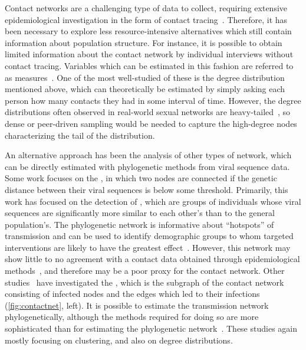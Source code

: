 Contact networks are a challenging type of data to collect, requiring extensive
epidemiological investigation in the form of contact
tracing~\autocite{morris1993epidemiology, welch2011statistical,
keeling2005networks, eames2015six}. Therefore, it has been necessary to explore
less resource-intensive alternatives which still contain information about
population structure. For instance, it is possible to obtain limited
information about the contact network by individual interviews without contact
tracing. Variables which can be estimated in this fashion are referred to as
 measures~\autocite{wasserman1994social}. One of the most
well-studied of these is the degree distribution mentioned above, which can 
theoretically be estimated by simply asking each person how many contacts they
had in some interval of time. However, the degree distributions often observed
in real-world sexual networks are heavy-tailed~\autocite{liljeros2001web,
schneeberger2004scale, colgate1989risk}, so dense or peer-driven sampling would
be needed to capture the high-degree nodes characterizing the tail of the
distribution.

An alternative approach has been the analysis of other types of network, which
can be directly estimated with phylogenetic methods from viral sequence data.
Some work focuses on the , in which two nodes are
connected if the genetic distance between their viral sequences is below some
threshold.  Primarily, this work has focused on the detection of
, which are groups of individuals whose viral
sequences are significantly more similar to each other's than to the general
population's.  The phylogenetic network is informative about ``hotspots'' of
transmission and can be used to identify demographic groups to whom targeted
interventions are likely to have the greatest effect~\autocite{poon2015impact}.
However, this network may show little to no agreement with a contact data
obtained through epidemiological methods~\autocite{yirrell1998molecular,
resik2007limitations, robinson2013dynamics}, and therefore may be a poor proxy
for the contact network. Other studies~\autocite{brown2011transmission} have
investigated the , which is the subgraph of the
contact network consisting of infected nodes and the edges which led to their
infections~\autocite{welch2011statistical} (\cref{fig:contactnet}, left). It is
possible to estimate the transmission network phylogenetically, although the
methods required for doing so are more sophisticated than for estimating the
phylogenetic network~\autocite{brown2011transmission}. These studies again
mostly focusing on clustering, and also on degree distributions.


